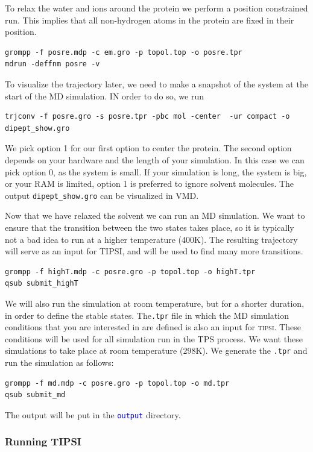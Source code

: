 \documentclass[]{article}
\begin{document}
% 
To relax the water and ions around the protein we perform a position constrained run. This implies that all non-hydrogen atoms in the protein are fixed in their position.
%
\begin{lstlisting}
grompp -f posre.mdp -c em.gro -p topol.top -o posre.tpr
mdrun -deffnm posre -v
\end{lstlisting}
%
To visualize the trajectory later, we need to make a snapshot of the system at the start of the MD simulation. IN order to do so, we run
%
\begin{lstlisting}
trjconv -f posre.gro -s posre.tpr -pbc mol -center  -ur compact -o dipept_show.gro
\end{lstlisting}
%
We pick option 1 for our first option to center the protein. The second option depends on your hardware and the length of your simulation. In this case we can pick option 0, as the system is small. If your simulation is long, the system is big, or your RAM is limited, option 1 is preferred to ignore solvent molecules. The output \texttt{dipept\_show.gro} can be visualized in \textsc{VMD}.

Now that we have relaxed the solvent we can run an MD simulation. We want to ensure that the transition between the two states takes place, so it is typically not a bad idea to run at a higher temperature (400K). The resulting trajectory will serve as an input for \textsc{TIPSI}, and will be used to find many more transitions.
%
\begin{lstlisting}
grompp -f highT.mdp -c posre.gro -p topol.top -o highT.tpr
qsub submit_highT
\end{lstlisting}
%
We will also run the simulation at room temperature, but for a shorter duration, in order to define the stable states. The\texttt{.tpr} file in which the MD simulation conditions that you are interested in are defined is also an input for \textsc{tipsi}. These conditions will be used for all simulation run in the TPS process. We want these simulations to take place at room temperature (298K). We generate the \texttt{.tpr} and run the simulation as follows:
%
\begin{lstlisting}
grompp -f md.mdp -c posre.gro -p topol.top -o md.tpr
qsub submit_md
\end{lstlisting}
%
The output will be put in the \texttt{\textcolor{blue}{output}} directory.

\subsubsection*{Running TIPSI}
\end{document}
